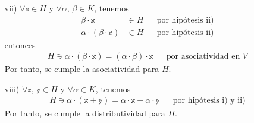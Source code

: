 \begin{theorem}
    \begin{enumerate}
        \item[vii)] $\forall \mathbb{x} \in H$ y $\forall \alpha$, $\beta \in K$, tenemos
        \begin{align*}
            \beta \cdot \mathbb{x} & \in H && \text{por hipótesis ii)} \\
            \alpha \cdot (\beta \cdot \mathbb{x}) & \in H && \text{por hipótesis ii)}
        \end{align*}
        entonces
        \begin{align*}
            H \ni \alpha \cdot (\beta \cdot \mathbb{x}) = (\alpha \cdot \beta) \cdot \mathbb{x} && \text{por asociatividad en $V$}
        \end{align*}
        Por tanto, se cumple la asociatividad para $H$.
        \item[viii)] $\forall \mathbb{x}$, $\mathbb{y} \in H$ y $\forall \alpha \in K$, tenemos
        \begin{align*}
            H \ni \alpha \cdot (\mathbb{x} +  \mathbb{y}) = \alpha \cdot \mathbb{x} + \alpha \cdot \mathbb{y} && \text{por hipótesis i) y ii)}
        \end{align*}
        Por tanto, se cumple la distributividad para $H$.


\end{enumerate}
\end{theorem}
